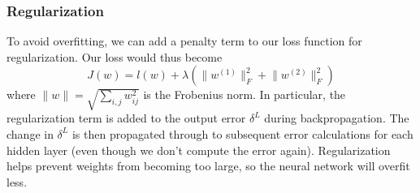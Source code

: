 \documentclass{article}
\begin{document}
\begin{multicols}{2}
\subsubsection{Regularization}

To avoid overfitting, we can add a penalty term to our loss function for regularization.
Our loss would thus become
\begin{equation}
    J(w) = l(w) +
      \lambda(\lVert w^{(1)} \rVert^2_F + \lVert w^{(2)} \rVert^2_F)
\end{equation}
where $\lVert w\rVert = \sqrt{\sum_{i,j}{w_{ij}^2}}$ is the Frobenius norm.
In particular, the regularization term is added to the output error $\delta^L$
during backpropagation. The change in $\delta^L$ is then propagated
through to subsequent error calculations for each hidden layer
(even though we don't compute the error again).
Regularization helps prevent weights from becoming too large,
so the neural network will overfit less.


\end{multicols}
\end{document}
